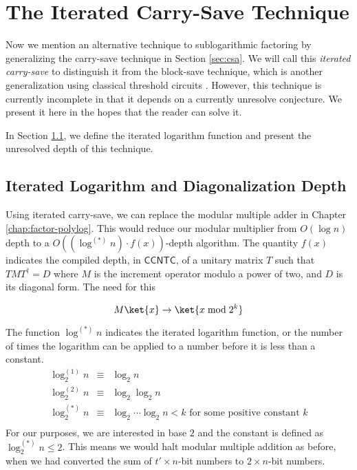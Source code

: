 \section{The Iterated Carry-Save Technique}
\label{sec:blocksave}

Now we mention an alternative technique to sublogarithmic
factoring by generalizing
the carry-save technique in Section \ref{sec:csa}. We will call this
\emph{iterated carry-save} to distinguish it from the block-save
technique, which is another generalization using classical threshold
circuits \cite{Siu1993}. However, this technique is currently incomplete
in that it depends on a currently unresolve conjecture. We present it
here in the hopes that the reader can solve it.

In Section \ref{subsec:fsl-itlog}, we define the iterated logarithm
function and present the unresolved depth of this technique.

\subsection{Iterated Logarithm and Diagonalization Depth}
\label{subsec:fsl-itlog}

Using iterated carry-save, we can replace the modular multiple adder in
Chapter \ref{chap:factor-polylog}. This
would reduce our modular multiplier from $O(\log n)$ depth to 
a $O((\log^{(*)}n)\cdot f(x))$-depth algorithm. The quantity $f(x)$ indicates
the compiled depth, in $\textsf{CCNTC}$, of a unitary matrix $T$ such that $TMT^{\dag} = D$
where $M$ is the increment operator modulo a power of two, and $D$ is its diagonal form.
The need for this 

\begin{equation}
M\ket{x} \rightarrow \ket{x \bmod 2^k}
\end{equation}

The function $\log^{(*)}n$ indicates
the iterated logarithm function, or the number of times the
logarithm can be applied to a number before it is less than a
constant.
\begin{eqnarray}
\log^{(1)}_2 n & \equiv & \log_2 n \\
\log^{(2)}_2 n & \equiv & \log_2\log_2 n \\
\log^{(*)}_2 n & \equiv & \log_2 \cdots \log_2 n < k \text{ for some positive constant } k\\
\end{eqnarray}
For our purposes, we are interested in base $2$ and
the constant is defined as $\log^{(*)}_2 n \le 2$. This
means we would halt modular multiple addition as before, when we
had converted the sum of $t'\times n$-bit numbers to $2 \times n$-bit numbers.

